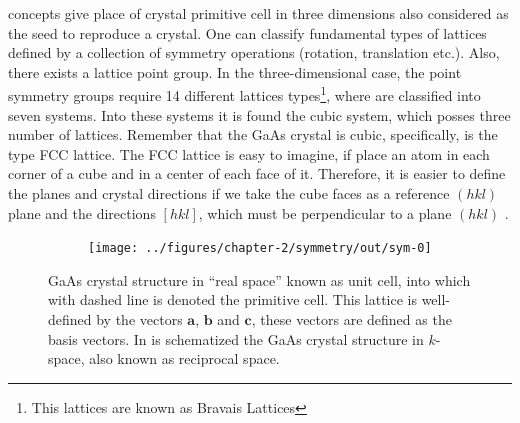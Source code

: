 concepts give place of crystal primitive cell in three dimensions also considered as the seed to reproduce a crystal. One can classify fundamental types of lattices defined by a collection of symmetry operations (rotation, translation etc.). Also, there exists a lattice point group. In the three-dimensional case, the point symmetry groups require  14 different lattices types\footnote{This lattices are known as Bravais Lattices}, where are classified into seven systems. Into these systems it is found the cubic system, which posses three number of lattices. Remember that the GaAs crystal is cubic, specifically, is the type FCC lattice. The FCC lattice is easy to imagine, if place an atom in each corner of a cube and in a center of each face of it. Therefore, it is easier to define the planes and crystal directions if we take the cube faces as a reference $(hkl)$ plane and the directions $\left[hkl\right]$, which must be perpendicular to a plane $(hkl)$ \cite{kittel2018kittel}.

\begin{figure}[h!]
	\centering
	\begin{subfigure}{\textwidth}
		\texttt{[image: ../figures/chapter-2/symmetry/out/sym-0]}
		\label{subfig:subsubsection-2.1-crystal-rspace-a)}
		\label{subfig:subsubsection-2.1-crystal-kspace-b)}
	\end{subfigure}
	\caption{
		 GaAs crystal structure in “real space” known as unit cell, into which with dashed line is denoted the primitive cell. This lattice is well-defined by the vectors  $\mathbf{a}$, $\mathbf{b}$ and  $\mathbf{c}$, these vectors are defined as the basis vectors. In  is schematized the GaAs crystal
structure in $k$-space, also known as reciprocal space.
		}
	\label{fig:subsubsection-2.1-crystal-r-k-space}
\end{figure}

